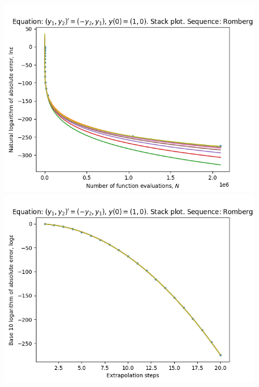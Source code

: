 \begin{figure}[H]
\centering
\begin{minipage}{0.45\textwidth}
\centering
\includegraphics[scale=0.45]{emr_plots/rotation_hp_romberg_stack.png}
\end{minipage}
\begin{minipage}{0.45\textwidth}
\centering
\includegraphics[scale=0.45]{emr_plots/rotation_hp_romberg_steps_stack.png}
\end{minipage}
\end{figure}

